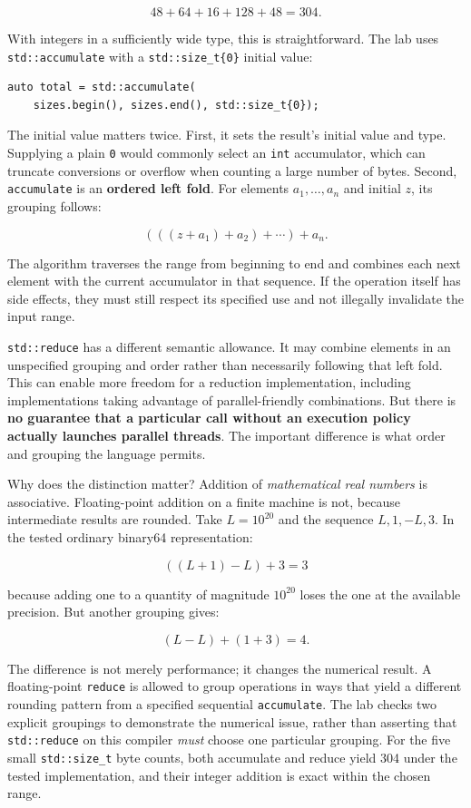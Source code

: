 \[
48+64+16+128+48 = 304.
\]

With integers in a sufficiently wide type, this is straightforward. The lab uses \texttt{std::accumulate} with a \texttt{std::size\_t\{0\}} initial value:

\begin{verbatim}
auto total = std::accumulate(
    sizes.begin(), sizes.end(), std::size_t{0});
\end{verbatim}

The initial value matters twice. First, it sets the result's initial value and type. Supplying a plain \texttt{0} would commonly select an \texttt{int} accumulator, which can truncate conversions or overflow when counting a large number of bytes. Second, \texttt{accumulate} is an \textbf{ordered left fold}. For elements \(a_1,\ldots,a_n\) and initial \(z\), its grouping follows:

\[
(((z+a_1)+a_2)+\cdots)+a_n.
\]

The algorithm traverses the range from beginning to end and combines each next element with the current accumulator in that sequence. If the operation itself has side effects, they must still respect its specified use and not illegally invalidate the input range.

\texttt{std::reduce} has a different semantic allowance. It may combine elements in an unspecified grouping and order rather than necessarily following that left fold. This can enable more freedom for a reduction implementation, including implementations taking advantage of parallel-friendly combinations. But there is \textbf{no guarantee that a particular call without an execution policy actually launches parallel threads}. The important difference is what order and grouping the language permits.

Why does the distinction matter? Addition of \emph{mathematical real numbers} is associative. Floating-point addition on a finite machine is not, because intermediate results are rounded. Take \(L=10^{20}\) and the sequence \(L,1,-L,3\). In the tested ordinary binary64 representation:

\[
((L+1)-L)+3 = 3
\]

because adding one to a quantity of magnitude \(10^{20}\) loses the one at the available precision. But another grouping gives:

\[
(L-L)+(1+3)=4.
\]

The difference is not merely performance; it changes the numerical result. A floating-point \texttt{reduce} is allowed to group operations in ways that yield a different rounding pattern from a specified sequential \texttt{accumulate}. The lab checks two explicit groupings to demonstrate the numerical issue, rather than asserting that \texttt{std::reduce} on this compiler \emph{must} choose one particular grouping. For the five small \texttt{std::size\_t} byte counts, both accumulate and reduce yield 304 under the tested implementation, and their integer addition is exact within the chosen range.

